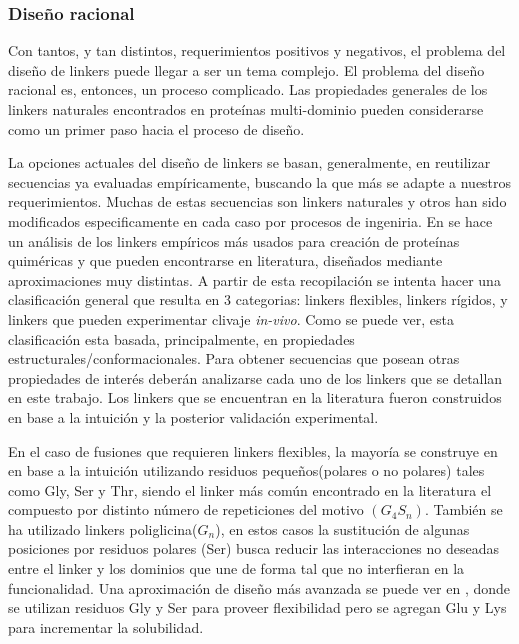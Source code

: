 \subsubsection{Diseño racional}


Con tantos, y tan distintos, requerimientos positivos y negativos, el problema del diseño de linkers puede llegar a ser un tema complejo.
El problema del diseño racional es, entonces, un proceso complicado.
Las propiedades generales de los linkers naturales encontrados en proteínas multi-dominio pueden considerarse como un primer paso hacia el proceso de diseño.




La opciones actuales del diseño de linkers se basan, generalmente,  en reutilizar secuencias ya evaluadas empíricamente, buscando la que más se adapte a nuestros requerimientos. 
Muchas de estas secuencias son linkers naturales y otros han sido modificados especificamente en cada caso por procesos de ingeniria.
En \cite{chen2013fusion} se hace un análisis de los linkers empíricos más usados para creación de proteínas quiméricas y que pueden encontrarse en literatura, diseñados mediante aproximaciones muy distintas.
A partir de esta recopilación se intenta hacer una clasificación general que resulta en 3 categorias:
linkers flexibles, linkers rígidos, y linkers que pueden experimentar clivaje \textit{in-vivo}. 
Como se puede ver, esta clasificación esta basada, principalmente, en propiedades estructurales/conformacionales. 
Para obtener secuencias que posean otras propiedades de interés deberán analizarse cada uno de los linkers que se detallan en este trabajo.
Los linkers que se encuentran  en la literatura fueron construidos en base a la intuición y la posterior validación experimental.


En el caso de fusiones que requieren linkers flexibles, la mayoría se construye en en base a la intuición utilizando residuos pequeños(polares o no polares) tales como Gly, Ser y Thr,
siendo el linker más común encontrado en la literatura el compuesto por distinto número de repeticiones del motivo $(G_4S_n)$. %
También se ha utilizado linkers poliglicina($G_n$), en estos casos la sustitución de algunas posiciones por residuos polares (Ser) busca reducir las interacciones no deseadas entre el linker y los dominios que une de forma
tal que no interfieran en la funcionalidad.
Una aproximación de diseño más avanzada se puede ver en \cite{bird1988single}, donde se utilizan residuos Gly y Ser para proveer flexibilidad pero se agregan Glu y Lys para incrementar la solubilidad.


